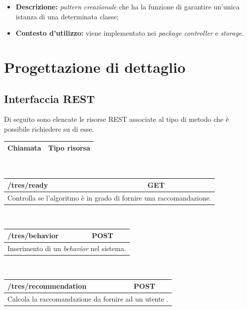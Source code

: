 \begin{itemize}
	\begin{itemize}
		\item \textbf{Descrizione:} \textit{pattern} \textit{creazionale} che ha la funzione di garantire un'unica istanza di una determinata classe;
		\item \textbf{Contesto d'utilizzo:} viene implementato nei \textit{package controller} e \textit{storage}.
	\end{itemize}
\end{itemize}

\newpage
\section{Progettazione di dettaglio}
\subsection{Interfaccia REST}
Di seguito sono elencate le risorse \gls{REST} associate al tipo di metodo che è possibile richiedere su di esse.
\begin{table}[h]
	\begin{tabular}{|p{}|p{}|}
		\toprule
		
		\textbf{Chiamata} & \textbf{Tipo risorsa}  \\
		\bottomrule
		\end{tabular}\\	
		\end{table}
		
		\begin{table}[h]
			\begin{tabular}{|p{}|p{}|}
				\toprule
				\textbf{/tres/ready} & \textbf{GET}  \\ \midrule
				\multicolumn{2}{|c|}{Controlla se l'algoritmo è in grado di fornire una raccomandazione.} \\
				\bottomrule
			\end{tabular}\\
				\par\bigskip
			
			\begin{tabular}{|p{}|p{}|}
				\toprule
				\textbf{/tres/behavior} & \textbf{POST}  \\ \midrule
				\multicolumn{2}{|c|}{Inserimento di un \textit{behavior} nel sistema.} \\
				\bottomrule
			\end{tabular}\\
				\par\bigskip
			
			\begin{tabular}{|p{}|p{}|}
				\toprule
				\textbf{/tres/recommendation} & \textbf{POST}  \\ \midrule
				\multicolumn{2}{|c|}{Calcola la raccomandazione da fornire ad un utente .} \\
				\bottomrule
			\end{tabular}\\
			\par\bigskip
		\end{table}
		
